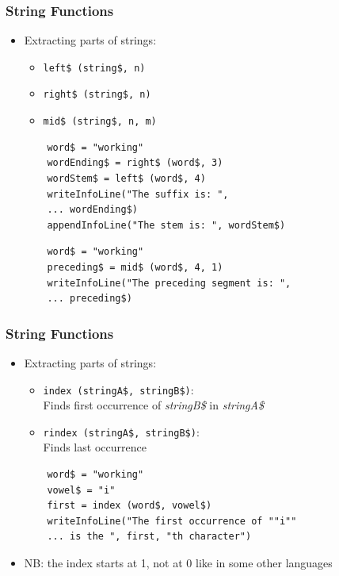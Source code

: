 \documentclass[handout]{beamer}
\begin{document}
\begin{frame}[fragile]
\frametitle{String Functions}
\begin{itemize}
    \item <1-> Extracting parts of strings:
    \begin{itemize}
        \item \texttt{left\$ (string\$, n)}
        \item \texttt{right\$ (string\$, n)}
        \item \texttt{mid\$ (string\$, n, m)}
    \end{itemize}

    \begin{verbatim}
    word$ = "working"
    wordEnding$ = right$ (word$, 3)
    wordStem$ = left$ (word$, 4)
    writeInfoLine("The suffix is: ",
    ... wordEnding$)
    appendInfoLine("The stem is: ", wordStem$)
    \end{verbatim}

    \begin{verbatim}
    word$ = "working"
    preceding$ = mid$ (word$, 4, 1)
    writeInfoLine("The preceding segment is: ",
    ... preceding$)
    \end{verbatim}

\end{itemize}
\end{frame}

\begin{frame}[fragile]
\frametitle{String Functions}
\begin{itemize}
    \item <1-> Extracting parts of strings:
    \begin{itemize}
        \item \texttt{index (stringA\$, stringB\$)}:
        \\Finds first occurrence of \emph{stringB\$} in \emph{stringA\$}
        \item \texttt{rindex (stringA\$, stringB\$)}:
        \\Finds last occurrence
    \end{itemize}

    \begin{verbatim}
    word$ = "working"
    vowel$ = "i"
    first = index (word$, vowel$)
    writeInfoLine("The first occurrence of ""i""
    ... is the ", first, "th character")
    \end{verbatim}

    \item <1-> NB: the index starts at 1, not at 0 like in some other languages

\end{itemize}
\end{frame}
\end{document}
